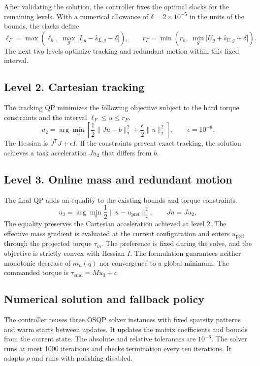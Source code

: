 \documentclass[12pt,a4paper]{article}
\begin{document}
After validating the solution, the controller fixes the optimal slacks for the
remaining levels. With a numerical allowance of $\delta = 2 \times 10^{-5}$ in
the units of the bounds, the slacks define
\begin{equation}
  \ell_F = \max\!\left( \ell_h,\ \max_g \bigl[ L_g - \hat s_{L,g} - \delta \bigr] \right),
  \qquad
  r_F = \min\!\left( r_h,\ \min_g \bigl[ U_g + \hat s_{U,g} + \delta \bigr] \right).
\end{equation}
The next two levels optimize tracking and redundant motion within this fixed
interval.

\subsection{Level 2. Cartesian tracking}
The tracking QP minimizes the following objective subject to the hard torque
constraints and the interval $\ell_F \le u \le r_F$.
\begin{equation}
  u_2 = \arg\min_u \left[ \frac{1}{2} \| J u - b \|_2^2
        + \frac{\epsilon}{2} \| u \|_2^2 \right], \qquad \epsilon = 10^{-8} .
\end{equation}
The Hessian is $J^{\mathsf T} J + \epsilon I$. If the constraints prevent exact
tracking, the solution achieves a task acceleration $J u_2$ that differs from $b$.

\subsection{Level 3. Online mass and redundant motion}
The final QP adds an equality to the existing bounds and torque constraints.
\begin{equation}
  u_3 = \arg\min_u \frac{1}{2} \| u - u_{\mathrm{pref}} \|_2^2, \qquad J u = J u_2 ,
\end{equation}
The equality preserves the Cartesian acceleration achieved at level 2. The
effective mass gradient is evaluated at the current configuration and enters
$u_{\mathrm{pref}}$ through the projected torque $\tau_m$. The preference is
fixed during the solve, and the objective is strictly convex with Hessian $I$.
The formulation guarantees neither monotonic decrease of $m_n(q)$ nor convergence
to a global minimum. The commanded torque is $\tau_{\mathrm{cmd}} = M u_3 + c$.

\subsection{Numerical solution and fallback policy}
The controller reuses three OSQP solver instances with fixed sparsity
patterns and warm starts between updates. It updates the matrix coefficients and
bounds from the current state. The absolute and relative tolerances are $10^{-6}$.
The solver runs at most 1000 iterations and checks termination every ten iterations.
It adapts $\rho$ and runs with polishing disabled.
\end{document}

